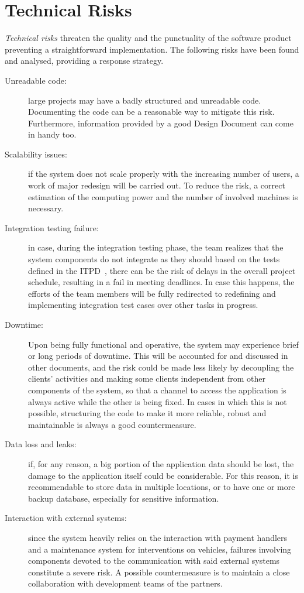 \section{Technical Risks}
\textit{Technical risks} threaten the quality and the punctuality of the software product preventing a straightforward implementation.
The following risks have been found and analysed, providing a response strategy. 
\begin{description}
\item[Unreadable code:] large projects may have a badly structured and unreadable code. Documenting the code can be a reasonable way to mitigate this risk. Furthermore, information provided by a good Design Document can come in handy too.
\item[Scalability issues:] if the system does not scale properly with the increasing number of users, a work of major redesign will be carried out. To reduce the risk, a correct estimation of the computing power and the number of involved machines is necessary.
\item[Integration testing failure:] in case, during the integration testing phase, the team realizes that the system components do not integrate as they should based on the tests defined in the ITPD~\cite{itpd}, there can be the risk of delays in the overall project schedule, resulting in a fail in meeting deadlines. In case this happens, the efforts of the team members will be fully redirected to redefining and implementing integration test cases over other tasks in progress.
\item[Downtime:] Upon being fully functional and operative, the system may experience brief or long periods of downtime. This will be accounted for and discussed in other documents, and the risk could be made less likely by decoupling the clients' activities and making some clients independent from other components of the system, so that a channel to access the application is always active while the other is being fixed. In cases in which this is not possible, structuring the code to make it more reliable, robust and maintainable is always a good countermeasure.
\item[Data loss and leaks:] if, for any reason, a big portion of the application data should be lost, the damage to the application itself could be considerable. For this reason, it is recommendable to store data in multiple locations, or to have one or more backup database, especially for sensitive information.
\item[Interaction with external systems:] since the system heavily relies on the interaction with payment handlers and a maintenance system for interventions on vehicles, failures involving components devoted to the communication with said external systems constitute a severe risk. A possible countermeasure is to maintain a close collaboration with development teams of the partners.
\end{description}

